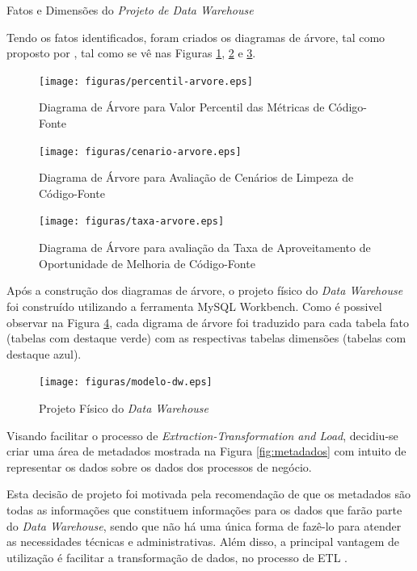 \begin{table}[h]
\centering

\caption{Fatos e Dimensões do \textit{Projeto de Data Warehouse} }
\label{tab:dimensoes-fato}
\end{table}
\FloatBarrier

Tendo os fatos identificados, foram criados os diagramas de árvore, tal como proposto por , tal como se vê nas Figuras \ref{fig:percentil-arvore}, \ref{fig:cenario-arvore} e \ref{fig:taxa-arvore}.

\begin{figure}[h]
\centering
\texttt{[image: figuras/percentil-arvore.eps]}
\caption{Diagrama de Árvore para Valor Percentil das Métricas de Código-Fonte}
\label{fig:percentil-arvore}
\end{figure}
\FloatBarrier


\begin{figure}[h]
\centering
\texttt{[image: figuras/cenario-arvore.eps]}
\caption{Diagrama de Árvore para Avaliação de Cenários de Limpeza de Código-Fonte}
\label{fig:cenario-arvore}
\end{figure}
\FloatBarrier


\begin{figure}[ht!]
\centering
\texttt{[image: figuras/taxa-arvore.eps]}
\caption{Diagrama de Árvore para avaliação da Taxa de Aproveitamento de Oportunidade de Melhoria de Código-Fonte}
\label{fig:taxa-arvore}
\end{figure}
\FloatBarrier


Após a construção dos diagramas de árvore, o projeto físico do \textit{Data Warehouse} foi construído utilizando a ferramenta MySQL Workbench. Como é possivel observar na Figura \ref{fig:project-dw}, cada digrama de árvore foi traduzido para cada tabela fato (tabelas com destaque verde) com as respectivas tabelas dimensões (tabelas com destaque azul).


\begin{figure}[ht!]
\centering
\texttt{[image: figuras/modelo-dw.eps]}
\caption{Projeto Físico do \textit{Data Warehouse}}
\label{fig:project-dw}
\end{figure}
\FloatBarrier

Visando facilitar o processo de \textit{Extraction-Transformation and Load}, decidiu-se criar uma área de metadados mostrada na Figura \ref{fig:metadados} com intuito de representar os dados sobre os dados dos processos de negócio.

Esta decisão de projeto foi motivada pela recomendação de que os metadados são todas as informações que constituem informações para os dados que farão parte do \textit{Data Warehouse}, sendo que não há uma única forma de fazê-lo para atender as necessidades técnicas e administrativas. Além disso, a principal vantagem de utilização é facilitar a transformação de dados, no processo de ETL \cite{Kimball2002}.


